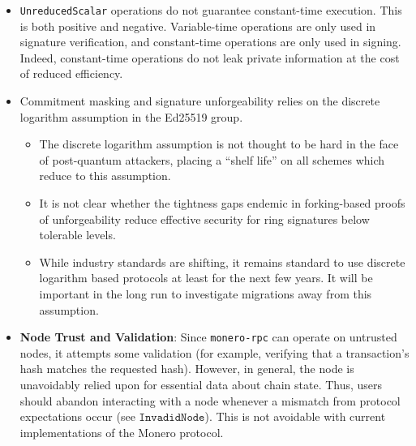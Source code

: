 \documentclass[12pt,a4paper]{article}
\begin{document}
\begin{itemize}
  \item \texttt{UnreducedScalar} operations do not guarantee constant-time execution. This is both positive and negative. Variable-time operations are only used in signature verification, and constant-time operations are only used in signing. Indeed, constant-time operations do not leak private information at the cost of reduced efficiency.

  \item Commitment masking and signature unforgeability relies on the discrete logarithm assumption in the Ed25519 group.
  \begin{itemize}
  \item The discrete logarithm assumption is not thought to be hard in the face of post-quantum attackers, placing a ``shelf life'' on all schemes which reduce to this assumption.

  \item It is not clear whether the tightness gaps endemic in forking-based proofs of unforgeability reduce effective security for ring signatures below tolerable levels.

  \item While industry standards are shifting, it remains standard to use discrete logarithm based protocols at least for the next few years. It will be important in the long run to investigate migrations away from this assumption.
  \end{itemize}

  \item   \textbf{Node Trust and Validation}: Since     \texttt{monero-rpc} can operate on untrusted nodes, it attempts some validation (for example, verifying that a transaction’s hash matches the requested hash).  However, in general, the node is unavoidably relied upon for essential data about chain state.  Thus, users should abandon interacting with a node whenever a mismatch from protocol expectations occur (see $\texttt{InvadidNode}$). This is not avoidable with current implementations of the Monero protocol.



\end{itemize}
\end{document}
